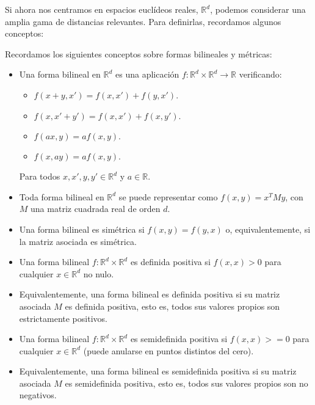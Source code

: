 Si ahora nos centramos en espacios euclídeos reales, $\mathbb{R}^d$, podemos considerar una amplia gama de distancias relevantes. Para definirlas, recordamos algunos conceptos:

\begin{definicion}
    Recordamos los siguientes conceptos sobre formas bilineales y métricas:

    \begin{itemize}
        \item Una forma bilineal en $\mathbb{R}^d$ es una aplicación $f\colon \mathbb{R}^d \times \mathbb{R}^d \to \mathbb{R}$ verificando:
        \begin{itemize}
            \item $f(x+y,x') = f(x,x') + f(y,x')$.
            \item $f(x,x'+y') = f(x,x') + f(x,y')$.
            \item $f(ax,y) = af(x,y).$
            \item $f(x,ay) = af(x,y).$
        \end{itemize}
        Para todos $x,x',y,y' \in \mathbb{R}^d$ y $a \in \mathbb{R}$.

        \item Toda forma bilineal en $\mathbb{R}^d$ se puede representar como $f(x,y) = x^TMy$, con $M$ una matriz cuadrada real de orden $d$.

        \item Una forma bilineal es simétrica si $f(x,y) = f(y,x)$ o, equivalentemente, si la matriz asociada es simétrica.

        \item Una forma bilineal $f \colon \mathbb{R}^d \times \mathbb{R}^d$ es definida positiva si $f(x,x) > 0$ para cualquier $x \in \mathbb{R}^d$ no nulo.

        \item Equivalentemente, una forma bilineal es definida positiva si su matriz asociada $M$ es definida positiva, esto es, todos sus valores propios son estrictamente positivos.

        \item Una forma bilineal $f \colon \mathbb{R}^d \times \mathbb{R}^d$ es semidefinida positiva si $f(x,x) >= 0$ para cualquier $x \in \mathbb{R}^d$ (puede anularse en puntos distintos del cero).

        \item Equivalentemente, una forma bilineal es semidefinida positiva si su matriz asociada $M$ es semidefinida positiva, esto es, todos sus valores propios son no negativos. 


\end{itemize}
\end{definicion}
